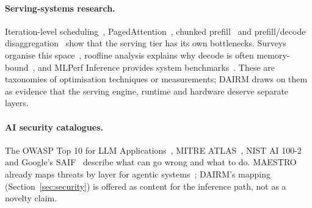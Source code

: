 \documentclass[11pt]{article}
\begin{document}
\paragraph{Serving-systems research.} Iteration-level scheduling~\cite{yu2022orca}, PagedAttention~\cite{kwon2023paged}, chunked prefill~\cite{agrawal2023sarathi} and prefill/decode disaggregation~\cite{zhong2024distserve} show that the serving tier has its own bottlenecks. Surveys organise this space~\cite{miao2023serving,li2024servingsurvey,pan2025inference}, roofline analysis explains why decode is often memory-bound~\cite{yuan2024roofline}, and MLPerf Inference provides system benchmarks~\cite{reddi2019mlperf}. These are taxonomies of optimisation techniques or measurements; DAIRM draws on them as evidence that the serving engine, runtime and hardware deserve separate layers.

\paragraph{AI security catalogues.} The OWASP Top 10 for LLM Applications~\cite{owasp2025llm}, MITRE ATLAS~\cite{mitreatlas}, NIST AI 100-2~\cite{nist2025aml} and Google's SAIF~\cite{googlesaif} describe what can go wrong and what to do. MAESTRO already maps threats by layer for agentic systems~\cite{huang2025maestro}; DAIRM's mapping (Section~\ref{sec:security}) is offered as content for the inference path, not as a novelty claim.
\end{document}
